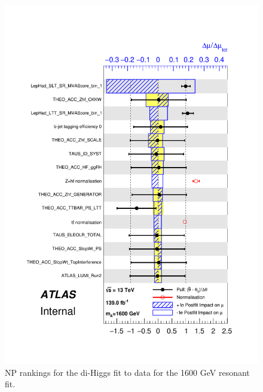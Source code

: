   \begin{figure}
   \centering
   \includegraphics[width=.8\textwidth]{figures/results/HH/LepHad/pulls_SigXsecOverSM_1600.pdf}
   \caption{NP rankings for the di-Higgs \lephad fit to data for the 1600 GeV resonant fit.}
   \label{fig:LepHadPostfitNPRankings2HDM1600}
   \end{figure}
   
